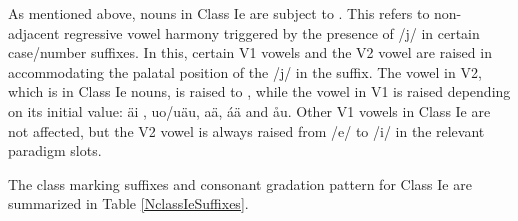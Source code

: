 As mentioned above, nouns in Class Ie are subject to \jvh. This refers to non-adjacent regressive vowel harmony triggered by the presence of /j/ in certain case/number suffixes. In this, certain V1 vowels and the V2 vowel are raised in accommodating the palatal position of the /j/ in the suffix. The vowel in V2, which is  in Class Ie nouns, is raised to , while the vowel in V1 is raised depending on its initial value: ä\ARROW i%
, uo/uä\ARROW u, %
a\ARROW ä,  á\ARROW ä and å\ARROW u. Other V1 vowels in Class Ie are not affected, but the V2 vowel is always raised from /e/ to /i/ in the relevant paradigm slots. %


The class marking suffixes and consonant gradation pattern for Class Ie are summarized in Table \vref{NclassIeSuffixes}. %


